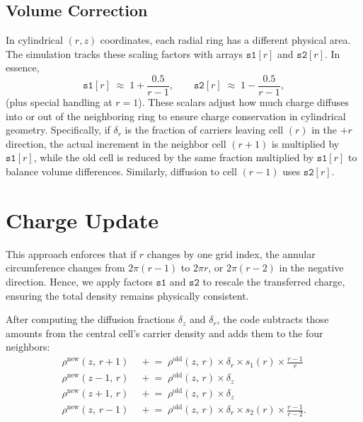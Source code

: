 \subsection{Volume Correction}

In cylindrical $(r,z)$ coordinates, each radial ring has a different 
physical area. The simulation tracks these scaling factors with arrays 
\(\texttt{s1}[r]\) and \(\texttt{s2}[r]\). In essence,
\[
\texttt{s1}[r] \;\approx\; 1 + \frac{0.5}{r-1}, 
\qquad
\texttt{s2}[r] \;\approx\; 1 - \frac{0.5}{r-1},
\] 
(plus special handling at $r=1$). These scalars adjust how much 
charge diffuses into or out of the neighboring ring to ensure charge conservation in cylindrical geometry. Specifically, 
if $\delta_r$ is the fraction of carriers leaving cell $(r)$ in 
the $+r$ direction, the actual increment in the neighbor cell 
$(r+1)$ is multiplied by $\texttt{s1}[r]$, while the old cell is 
reduced by the same fraction multiplied by $\texttt{s1}[r]$ to 
balance volume differences. Similarly, diffusion to cell $(r-1)$ 
uses $\texttt{s2}[r]$.

\section{Charge Update}

This approach enforces that if $r$ changes by one grid index, 
the annular circumference changes from $2\pi (r-1)$ to $2\pi r$, 
or $2\pi (r-2)$ in the negative direction. Hence, we apply factors
\(\texttt{s1}\) and \(\texttt{s2}\) to rescale the transferred 
charge, ensuring the total density remains physically consistent.

After computing the diffusion fractions $\delta_z$ and $\delta_r$, 
the code subtracts those amounts from the central cell's carrier density 
and adds them to the four neighbors:
\begin{align}
  \rho^{\mathrm{new}}(z,\,r+1) &\;\mathrel{+}= \;\rho^{\mathrm{old}}(z,\,r)\times\delta_r \times s_1(r) \times \frac{r-1}{r} \label{ch3:eq:diffusion_update_1} \\
  \rho^{\mathrm{new}}(z-1,\,r) &\;\mathrel{+}= \;\rho^{\mathrm{old}}(z,\,r)\times\delta_z \label{ch3:eq:diffusion_update_2} \\
  \rho^{\mathrm{new}}(z+1,\,r) &\;\mathrel{+}= \;\rho^{\mathrm{old}}(z,\,r)\times\delta_z \label{ch3:eq:diffusion_update_3} \\
  \rho^{\mathrm{new}}(z,\,r-1) &\;\mathrel{+}= \;\rho^{\mathrm{old}}(z,\,r) \times \delta_r \times s_2(r) \times\frac{r-1}{r-2} \label{ch3:eq:diffusion_update_4}.
\end{align}
 
